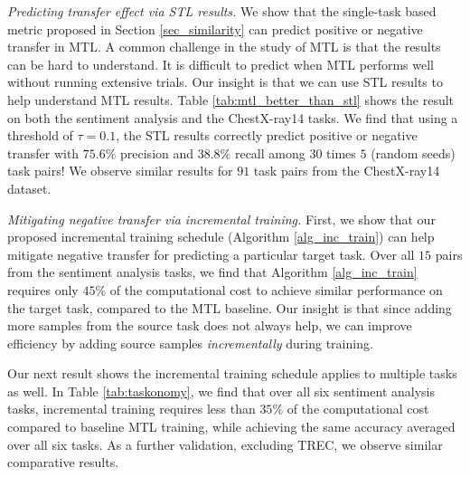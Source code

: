 \textit{Predicting transfer effect via STL results.}
We show that the single-task based metric proposed in Section \ref{sec_similarity} can predict positive or negative transfer in MTL.
A common challenge in the study of MTL is that the results can be hard to understand.
It is difficult to predict when MTL performs well without running extensive trials.
Our insight is that we can use STL results to help understand MTL results.
Table \ref{tab:mtl_better_than_stl} shows the result on both the sentiment analysis and the ChestX-ray14 tasks.
We find that using a threshold of $\tau = 0.1$, the STL results correctly predict positive or negative transfer with $75.6\%$ precision and $38.8\%$ recall among $30$ times $5$ (random seeds) task pairs!
We observe similar results for $91$ task pairs from the ChestX-ray14 dataset.

\textit{Mitigating negative transfer via incremental training.}
First, we show that our proposed incremental training schedule (Algorithm \ref{alg_inc_train}) can help mitigate negative transfer for predicting a particular target task.
Over all $15$ pairs from the sentiment analysis tasks, we find that Algorithm \ref{alg_inc_train} requires only $45\%$ of the computational cost to achieve similar performance on the target task, compared to the MTL baseline.
Our insight is that since adding more samples from the source task does not always help, we can improve efficiency by adding source samples \textit{incrementally} during training.


Our next result shows the incremental training schedule applies to multiple tasks as well.
In Table \ref{tab:taskonomy}, we find that over all six sentiment analysis tasks, incremental training requires less than $35\%$ of the computational cost compared to baseline MTL training, while achieving the same accuracy averaged over all six tasks.
As a further validation, excluding TREC, we observe similar comparative results.


